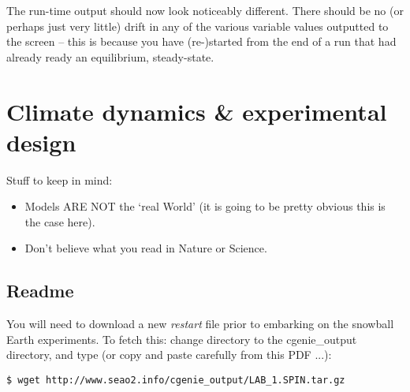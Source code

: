 \documentclass[11pt,fleqn]{book} %
\begin{document}
The run-time output should now look noticeably different. There should be no (or perhaps just very little) drift in any of the various variable values outputted to the screen – this is because you have (re-)started from the end of a run that had already ready an equilibrium, steady-state.


\cleardoublepage


\chapter{Climate dynamics \& experimental design}

\hfill \break

\noindent Stuff to keep in mind:

\begin{itemize}
\vspace{1mm}
\item Models ARE NOT the ‘real World’ (it is going to be pretty obvious this is the case here).
\vspace{1mm}
\item Don’t believe what you read in Nature or Science.
\end{itemize}


\newpage


\section*{Readme}

You will need to download a new \textit{restart} file prior to embarking on the snowball Earth experiments.
To fetch this: change directory to the \textsf{\footnotesize cgenie\_output} directory, and type (or copy and paste carefully from this PDF ...):
\vspace{-2mm}
\begin{verbatim}
$ wget http://www.seao2.info/cgenie_output/LAB_1.SPIN.tar.gz
\end{verbatim}
\vspace{-2mm}
\end{document}
